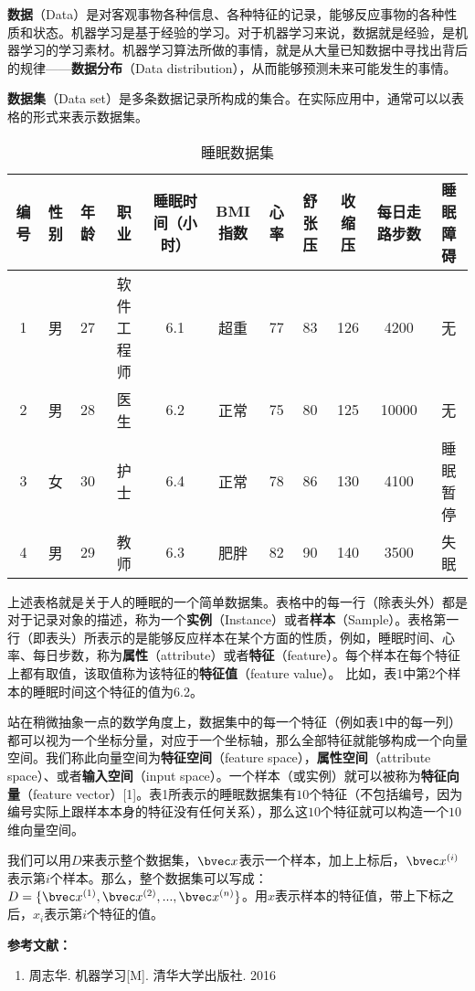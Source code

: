 

\textbf{数据}（Data）是对客观事物各种信息、各种特征的记录，能够反应事物的各种性质和状态。机器学习是基于经验的学习。对于机器学习来说，数据就是经验，是机器学习的学习素材。机器学习算法所做的事情，就是从大量已知数据中寻找出背后的规律——\textbf{数据分布}（Data distribution），从而能够预测未来可能发生的事情。

\textbf{数据集}（Data set）是多条数据记录所构成的集合。在实际应用中，通常可以以表格的形式来表示数据集。

\begin{table}[ht]
\centering
\caption{睡眠数据集}\label{tab_datast2}
\begin{tabular}{|c|c|c|c|c|c|c|c|c|c|c|}
\hline
编号 & 性别 & 年龄 & 职业 & 睡眠时间（小时） & BMI指数 & 心率 & 舒张压 & 收缩压 & 每日走路步数 & 睡眠障碍 \\\hline
1 & 男 & 27 & 软件工程师 & 6.1 & 超重 & 77 & 83 & 126 & 4200 & 无 \\
\hline
2 & 男 & 28 & 医生 & 6.2 & 正常 & 75 & 80 & 125 & 10000 & 无 \\
\hline
3 & 女 & 30 & 护士 & 6.4 & 正常 & 78 & 86 & 130 & 4100 & 睡眠暂停 \\
\hline
4 & 男 & 29 & 教师 & 6.3 & 肥胖 & 82 & 90 & 140 & 3500 & 失眠 \\
\hline
\end{tabular}
\end{table}

上述表格就是关于人的睡眠的一个简单数据集。表格中的每一行（除表头外）都是对于记录对象的描述，称为一个\textbf{实例}（Instance）或者\textbf{样本}（Sample）。表格第一行（即表头）所表示的是能够反应样本在某个方面的性质，例如，睡眠时间、心率、每日步数，称为\textbf{属性}（attribute）或者\textbf{特征}（feature）。每个样本在每个特征上都有取值，该取值称为该特征的\textbf{特征值}（feature value）。
比如，表1中第2个样本的睡眠时间这个特征的值为6.2。

站在稍微抽象一点的数学角度上，数据集中的每一个特征（例如表1中的每一列）都可以视为一个坐标分量，对应于一个坐标轴，那么全部特征就能够构成一个向量空间。我们称此向量空间为\textbf{特征空间}（feature space），\textbf{属性空间}（attribute space）、或者\textbf{输入空间}（input space）。一个样本（或实例）就可以被称为\textbf{特征向量}（feature vector）[1]。表1所表示的睡眠数据集有$10$个特征（不包括编号，因为编号实际上跟样本本身的特征没有任何关系），那么这$10$个特征就可以构造一个$10$维向量空间。

我们可以用$D$来表示整个数据集，$\bvec x$表示一个样本，加上上标后，$\bvec x^{(i)}$表示第$i$个样本。那么，整个数据集可以写成：$D=\{\bvec x^{(1)}, \bvec x^{(2)}, ..., \bvec x^{(n)}\}$。用$x$表示样本的特征值，带上下标之后，$x_i$表示第$i$个特征的值。$$


\textbf{参考文献：}
\begin{enumerate}
\item 周志华. 机器学习[M]. 清华大学出版社. 2016
\end{enumerate}
